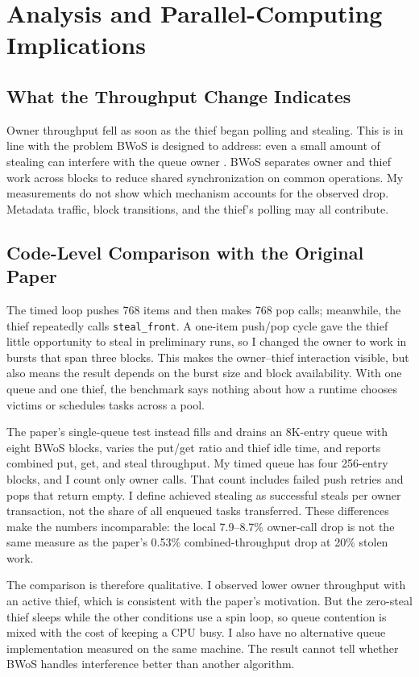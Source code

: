 \documentclass[conference]{IEEEtran}
\begin{document}
\section{Analysis and Parallel-Computing Implications}
\subsection{What the Throughput Change Indicates}
Owner throughput fell as soon as the thief began polling and stealing. This is in line with the problem BWoS is designed to address: even a small amount of stealing can interfere with the queue owner \cite{wang2023bwos}. BWoS separates owner and thief work across blocks to reduce shared synchronization on common operations. My measurements do not show which mechanism accounts for the observed drop. Metadata traffic, block transitions, and the thief's polling may all contribute.

\subsection{Code-Level Comparison with the Original Paper}
The timed loop pushes 768 items and then makes 768 pop calls; meanwhile, the thief repeatedly calls \texttt{steal\_front}. A one-item push/pop cycle gave the thief little opportunity to steal in preliminary runs, so I changed the owner to work in bursts that span three blocks. This makes the owner--thief interaction visible, but also means the result depends on the burst size and block availability. With one queue and one thief, the benchmark says nothing about how a runtime chooses victims or schedules tasks across a pool.

The paper's single-queue test instead fills and drains an 8K-entry queue with eight BWoS blocks, varies the put/get ratio and thief idle time, and reports combined put, get, and steal throughput. My timed queue has four 256-entry blocks, and I count only owner calls. That count includes failed push retries and pops that return empty. I define achieved stealing as successful steals per owner transaction, not the share of all enqueued tasks transferred. These differences make the numbers incomparable: the local 7.9--8.7\% owner-call drop is not the same measure as the paper's 0.53\% combined-throughput drop at 20\% stolen work.

The comparison is therefore qualitative. I observed lower owner throughput with an active thief, which is consistent with the paper's motivation. But the zero-steal thief sleeps while the other conditions use a spin loop, so queue contention is mixed with the cost of keeping a CPU busy. I also have no alternative queue implementation measured on the same machine. The result cannot tell whether BWoS handles interference better than another algorithm.
\end{document}
